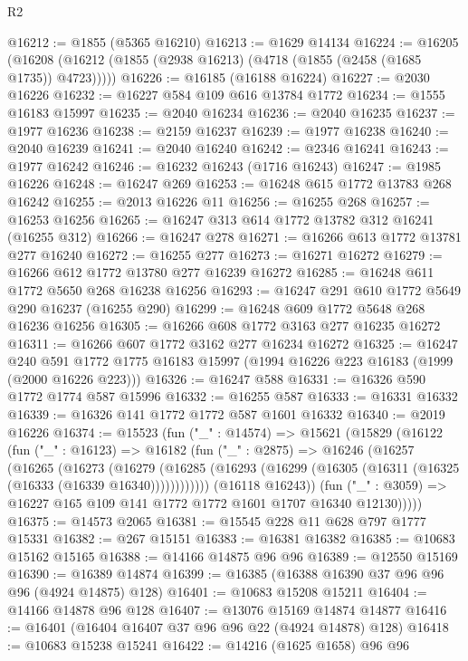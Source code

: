 \begin{lexlean}{R2}
\begin{coremodule}
@16212 := @1855 (@5365 @16210)
@16213 := @1629 @14134
@16224 := @16205
    (@16208 (@16212 (@1855 (@2938 @16213) (@4718 (@1855 (@2458 (@1685 @1735)) @4723)))))
@16226 := @16185 (@16188 @16224)
@16227 := @2030 @16226
@16232 := @16227 @584 @109 @616 @13784 @1772
@16234 := @1555 @16183 @15997
@16235 := @2040 @16234
@16236 := @2040 @16235
@16237 := @1977 @16236
@16238 := @2159 @16237
@16239 := @1977 @16238
@16240 := @2040 @16239
@16241 := @2040 @16240
@16242 := @2346 @16241
@16243 := @1977 @16242
@16246 := @16232 @16243 (@1716 @16243)
@16247 := @1985 @16226
@16248 := @16247 @269
@16253 := @16248 @615 @1772 @13783 @268 @16242
@16255 := @2013 @16226 @11
@16256 := @16255 @268
@16257 := @16253 @16256
@16265 := @16247 @313 @614 @1772 @13782 @312 @16241 (@16255 @312)
@16266 := @16247 @278
@16271 := @16266 @613 @1772 @13781 @277 @16240
@16272 := @16255 @277
@16273 := @16271 @16272
@16279 := @16266 @612 @1772 @13780 @277 @16239 @16272
@16285 := @16248 @611 @1772 @5650 @268 @16238 @16256
@16293 := @16247 @291 @610 @1772 @5649 @290 @16237 (@16255 @290)
@16299 := @16248 @609 @1772 @5648 @268 @16236 @16256
@16305 := @16266 @608 @1772 @3163 @277 @16235 @16272
@16311 := @16266 @607 @1772 @3162 @277 @16234 @16272
@16325 := @16247
    @240
    @591
    @1772
    @1775
    @16183
    @15997
    (@1994 @16226 @223 @16183 (@1999 (@2000 @16226 @223)))
@16326 := @16247 @588
@16331 := @16326 @590 @1772 @1774 @587 @15996
@16332 := @16255 @587
@16333 := @16331 @16332
@16339 := @16326 @141 @1772 @1772 @587 @1601 @16332
@16340 := @2019 @16226
@16374 := @15523
    (fun ("_" : @14574) =>
    @15621
      (@15829
        (@16122
          (fun ("_" : @16123) =>
          @16182
            (fun ("_" : @2875) =>
            @16246
              (@16257
                (@16265
                  (@16273
                    (@16279
                      (@16285
                        (@16293 (@16299 (@16305 (@16311 (@16325 (@16333 (@16339 @16340))))))))))))
              (@16118 @16243))
            (fun ("_" : @3059) => @16227 @165 @109 @141 @1772 @1772 @1601 @1707 @16340 @12130)))))
@16375 := @14573 @2065
@16381 := @15545 @228 @11 @628 @797 @1777 @15331
@16382 := @267 @15151
@16383 := @16381 @16382
@16385 := @10683 @15162 @15165
@16388 := @14166 @14875 @96 @96
@16389 := @12550 @15169
@16390 := @16389 @14874
@16399 := @16385 (@16388 @16390 @37 @96 @96 @96 (@4924 @14875) @128)
@16401 := @10683 @15208 @15211
@16404 := @14166 @14878 @96 @128
@16407 := @13076 @15169 @14874 @14877
@16416 := @16401 (@16404 @16407 @37 @96 @96 @22 (@4924 @14878) @128)
@16418 := @10683 @15238 @15241
@16422 := @14216 (@1625 @1658) @96 @96

\end{coremodule}
\end{lexlean}

